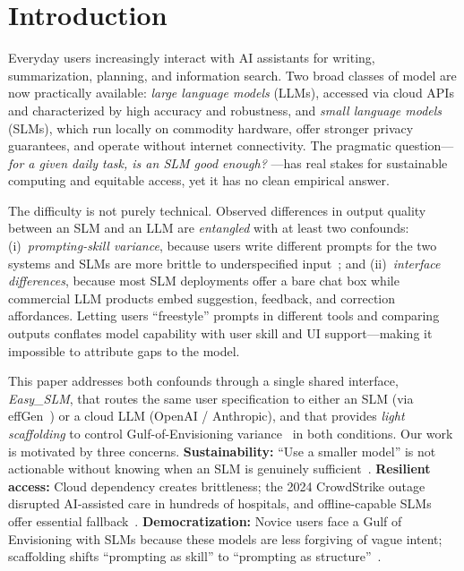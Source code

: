 \section{Introduction}

Everyday users increasingly interact with AI assistants for writing,
summarization, planning, and information search.
Two broad classes of model are now practically available: \textit{large language
models} (LLMs), accessed via cloud APIs and characterized by high accuracy and
robustness, and \textit{small language models} (SLMs), which run locally on
commodity hardware, offer stronger privacy guarantees, and operate without
internet connectivity.
The pragmatic question---\textit{for a given daily task, is an SLM good enough?}
---has real stakes for sustainable computing and equitable access, yet it has no
clean empirical answer.

The difficulty is not purely technical.
Observed differences in output quality between an SLM and an LLM are
\textit{entangled} with at least two confounds: (i)~\textit{prompting-skill
variance}, because users write different prompts for the two systems and SLMs are
more brittle to underspecified input~\cite{zamfirescu2023johnny,
subramonyam2024gulf}; and (ii)~\textit{interface differences}, because most
SLM deployments offer a bare chat box while commercial LLM products embed
suggestion, feedback, and correction affordances.
Letting users ``freestyle'' prompts in different tools and comparing outputs
conflates model capability with user skill and UI support---making it impossible
to attribute gaps to the model.

This paper addresses both confounds through a single shared interface,
\textit{Easy\_SLM}, that routes the same user specification to either an SLM
(via effGen~\cite{effgen}) or a cloud LLM (OpenAI / Anthropic), and that
provides \textit{light scaffolding} to control Gulf-of-Envisioning
variance~\cite{subramonyam2024gulf} in both conditions.
Our work is motivated by three concerns.
\textbf{Sustainability:} ``Use a smaller model'' is not actionable without
knowing when an SLM is genuinely sufficient~\cite{crawford2024rematerializing}.
\textbf{Resilient access:} Cloud dependency creates brittleness; the 2024
CrowdStrike outage disrupted AI-assisted care in hundreds of hospitals, and
offline-capable SLMs offer essential fallback~\cite{tully2025crowdstrike}.
\textbf{Democratization:} Novice users face a Gulf of Envisioning with SLMs
because these models are less forgiving of vague intent; scaffolding shifts
``prompting as skill'' to ``prompting as structure''~\cite{zamfirescu2023johnny}.

